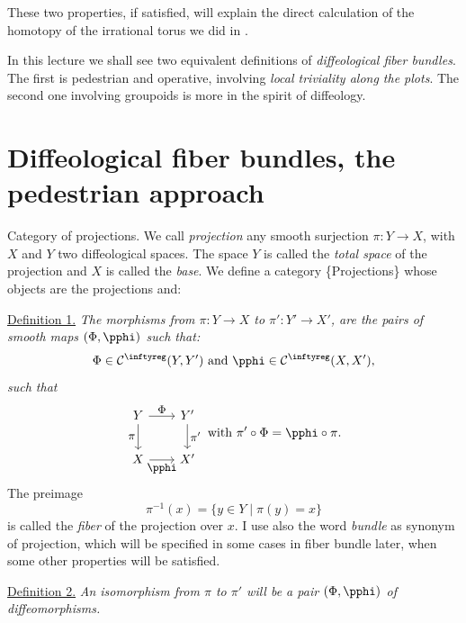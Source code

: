These two properties,
if satisfied,
will explain the direct calculation of the homotopy of the irrational torus we did in \cite{DI83}.

In this lecture we shall see two equivalent definitions of \emph{diffeological fiber bundles}.
The first is pedestrian and operative,
involving \emph{local triviality along the plots}.
The second one involving groupoids is more in the spirit of diffeology.

\section{Diffeological fiber bundles, the pedestrian approach}

\begin{Article}{Category of projections.}{}
  We call \emph{projection} any smooth surjection $\pi \colon Y \to X$,
  with $X$ and $Y$ two diffeological spaces.
  The space $Y$ is called the \emph{total space} of the projection and $X$ is called the \emph{base}.
  We define a category \{Projections\} whose objects are the projections and:

  \uline{Definition 1.} {\itshape The \emph{morphisms}
  from $\pi \colon Y \to X$  to $\pi' \colon Y' \to X'$,
  are the pairs of smooth maps $(\Phi,\pphi)$ such that:
  $$%
    \Phi \in \Cinfty(Y,Y')
    \SpacedText{and}
    \pphi \in \Cinfty(X,X'),
  $$%
  such that
  $$%
    \begin{tikzcd}[column sep=2em, row sep=2em,every label/.append style = {font = \small}]
    Y \arrow[d, swap, "\pi"]  \arrow[r, "\Phi"] &  Y' \arrow[d,"\pi'"] \\
    X \arrow[r, swap, "\pphi"] & X'
    \end{tikzcd}
    \SpacedText{with}
    \pi' \circ \Phi = \pphi \circ \pi.
  $$%
  }
  The preimage
  $$%
    \pi^{-1}(x) = \{y \in Y \mid \pi(y) = x\}
  $$%
  is called the \emph{fiber} of the projection over $x$.
  I use also the word \emph{bundle} as synonym of projection,
  which will be specified in some cases in fiber bundle later,
  when some other properties will be satisfied.

  \uline{Definition 2.} {\itshape An \emph{isomorphism} from $\pi$ to $\pi'$ will be a pair $(\Phi,\pphi)$ of diffeomorphisms.}
\end{Article}

